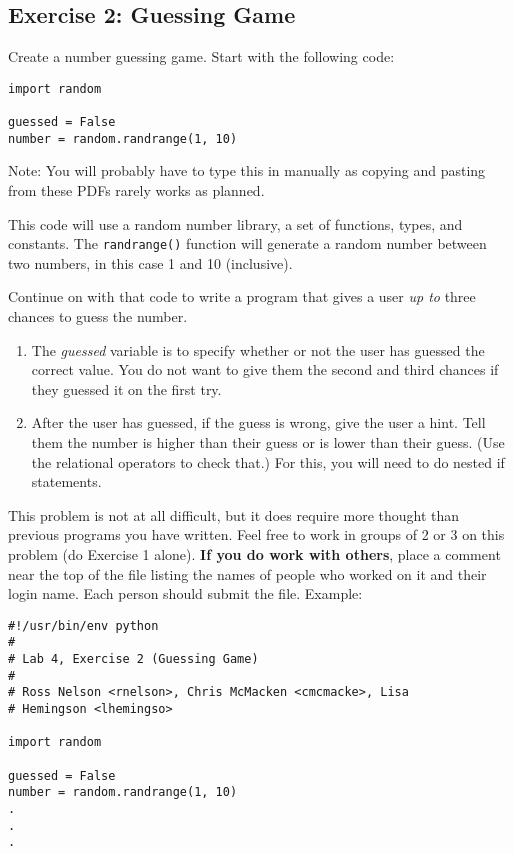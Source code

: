 \documentclass[11pt, letterpaper]{article}
\begin{document}
\subsection*{Exercise 2: Guessing Game}

Create a number guessing game. Start with the following code:

\begin{lstlisting}
import random

guessed = False
number = random.randrange(1, 10)
\end{lstlisting}

{\small Note: You will probably have to type this in manually as copying and pasting from these PDFs rarely works as planned.}

This code will use a random number library, a set of functions, types, and constants. The {\tt randrange()} function will generate a random number between two numbers, in this case 1 and 10 (inclusive).

Continue on with that code to write a program that gives a user {\em up to} three chances to guess the number.

\begin{enumerate}
	\item The {\em guessed} variable is to specify whether or not the user has guessed the correct value. You do not want to give them the second and third chances if they guessed it on the first try.
	\item After the user has guessed, if the guess is wrong, give the user a hint. Tell them the number is higher than their guess or is lower than their guess. (Use the relational operators to check that.) For this, you will need to do nested if statements.
\end{enumerate}

This problem is not at all difficult, but it does require more thought than previous programs you have written. Feel free to work in groups of 2 or 3 on this problem (do Exercise 1 alone). {\bf If you do work with others}, place a comment near the top of the file listing the names of people who worked on it and their login name. Each person should submit the file. Example:

\begin{lstlisting}
#!/usr/bin/env python
#
# Lab 4, Exercise 2 (Guessing Game)
# 
# Ross Nelson <rnelson>, Chris McMacken <cmcmacke>, Lisa
# Hemingson <lhemingso>

import random

guessed = False
number = random.randrange(1, 10)
.
.
.
\end{lstlisting}
\end{document}
